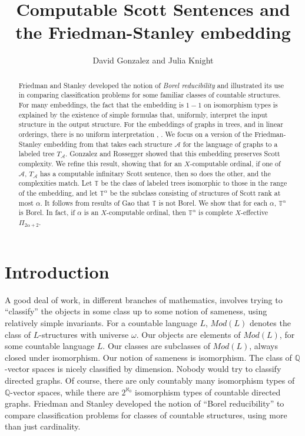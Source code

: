 \documentclass{article}
\begin{document}
\title{Computable Scott Sentences and the Friedman-Stanley embedding}

\author{David Gonzalez and Julia Knight}

\maketitle

\begin{abstract}

Friedman and Stanley \cite{FS} developed the notion of \emph{Borel reducibility} and illustrated its use in comparing classification problems for some familiar classes of countable structures.  For many embeddings, the fact that the embedding is $1-1$ on isomorphism types is explained by the existence of simple formulas that, uniformly, interpret the input structure in the output structure.  For the embeddings of graphs in trees, and in linear orderings, there is no uniform interpretation \cite{H-TM}, \cite{KSV}.  We focus on a version of the Friedman-Stanley embedding from \cite{H-TM} that takes each structure $\mathcal{A}$ for the language of graphs to a labeled tree $T_\mathcal{A}$.  Gonzalez and Rossegger \cite{GR} showed that this embedding preserves Scott complexity.  We refine this result, showing that for an $X$-computable ordinal, if one of $\mathcal{A}$, $T_\mathcal{A}$ has a computable infinitary Scott sentence, then so does the other, and the complexities match.  Let $\mathbb{T}$ be the class of labeled trees isomorphic to those in the range of the embedding, and let $\mathbb{T}^\alpha$ be the subclass consisting of structures of Scott rank at most $\alpha$.  It follows from results of Gao \cite{gao} that $\mathbb{T}$ is not Borel.  We show that for each $\alpha$, $\mathbb{T}^\alpha$ is Borel.  In fact, if $\alpha$ is an $X$-computable ordinal, then $\mathbb{T}^\alpha$  is complete $X$-effective $\Pi_{2\alpha+2}$.    
\end{abstract}    

\section{Introduction}

A good deal of work, in different branches of mathematics, involves trying to ``classify'' the objects in some class up to some notion of sameness, using relatively simple invariants.  For a countable language $L$, $Mod(L)$ denotes the class of $L$-structures with universe $\omega$.  Our objects are elements of $Mod(L)$, for some countable language $L$.  Our classes are subclasses of $Mod(L)$, always closed under isomorphism.  Our notion of sameness is isomorphism.  The class of $\mathbb{Q}$-vector spaces is nicely classified by dimension.  Nobody would try to classify directed graphs.  Of course, there are only countably many isomorphism types of $\mathbb{Q}$-vector spaces, while there are $2^{\aleph_0}$ isomorphism types of countable directed graphs. Friedman and Stanley \cite{FS} developed the notion of ``Borel reducibility'' to compare classification problems for classes of countable structures, using more than just cardinality.    
\end{document}
